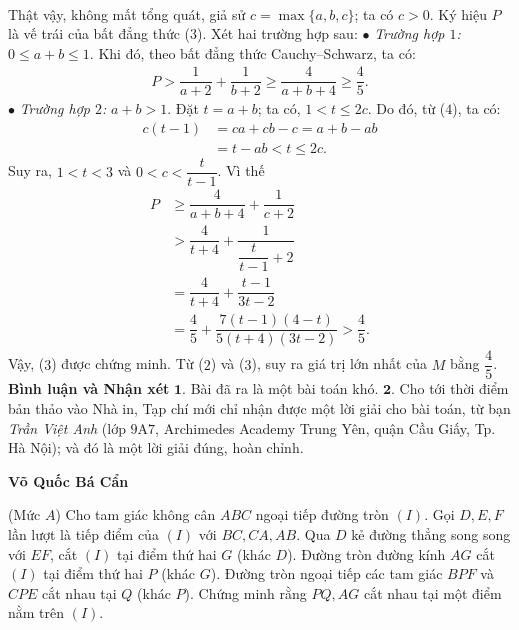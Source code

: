 \begin{multicols}{2}
\begin{align*}
	\end{align*}
	Thật vậy, không mất tổng quát, giả sử \linebreak$c = \max\{a,b,c\}$;  ta có $c > 0$.
	\vskip 0.05cm
	Ký hiệu $P$ là vế trái của bất đẳng thức ($3$).
	\vskip 0.05cm
	Xét hai trường hợp sau:
	\vskip 0.05cm
	$\bullet$ \textit{Trường hợp $1$:} $0 \le a + b \le 1$.
	\vskip 0.05cm
	Khi đó, theo bất đẳng thức Cauchy--Schwarz, ta có:
	\begin{align*}
		P > \dfrac{1}{{a + 2}} + \dfrac{1}{{b + 2}} \ge \dfrac{4}{{a + b + 4}} \ge \dfrac{4}{5}.
	\end{align*}
	$\bullet$ \textit{Trường hợp $2$:} $a + b > 1$.
	\vskip 0.05cm
	Đặt $t = a + b$; ta có, $1 < t \le 2c$. Do đó, từ ($4$), ta có:
	\begin{align*}
		c(t - 1) &= ca + cb - c = a + b - ab \\
		&= t - ab < t \le 2c.
	\end{align*}
	Suy ra, $1 < t < 3$ và $0 < c < \dfrac{t}{t-1}$.  
	Vì thế
	\begin{align*}
		P &\ge \dfrac{4}{a + b + 4} + \dfrac{1}{c + 2}\\
		 &> \dfrac{4}{t + 4} + \dfrac{1}{\dfrac{t}{t-1} + 2}\\
		 &= \dfrac{4}{t + 4} + \dfrac{t-1}{3t - 2}\\
		 &= \dfrac{4}{5} + \dfrac{7(t-1)(4-t)}{5(t+4)(3t-2)}>\dfrac{4}{5}.
	\end{align*}
	Vậy, ($3$) được chứng minh.
	\vskip 0.05cm
	Từ ($2$) và ($3$), suy ra giá trị lớn nhất của $M$ bằng $\dfrac{4}{5}$.
	\vskip 0.05cm 
	\textbf{\color{thachthuctoanhoc}Bình luận và Nhận xét}
	\vskip 0.05cm
	$\pmb{1.}$ Bài đã ra là một bài toán khó.
	\vskip 0.05cm
	$\pmb{2.}$ Cho tới thời điểm bản thảo vào Nhà in, Tạp chí mới chỉ nhận được một lời giải cho bài toán, từ bạn \textit{Trần Việt Anh} (lớp $9$A$7$, Archimedes Academy Trung Yên, quận Cầu Giấy, Tp. Hà Nội); và đó là một lời giải đúng, hoàn chỉnh.
	\begin{flushright}
		\textbf{\color{thachthuctoanhoc}Võ Quốc Bá Cẩn}
	\end{flushright}
	{}
	(Mức $A$) Cho tam giác không cân $ABC$ ngoại tiếp đường tròn $(I)$. Gọi $D,E,F$ lần lượt là tiếp điểm của $(I)$ với $BC,CA,AB$. Qua $D$ kẻ đường thẳng song song với $EF$, cắt $(I)$ tại điểm thứ hai $G$ (khác $D$). Đường tròn đường kính $AG$ cắt $(I)$ tại điểm thứ hai $P$ (khác $G$). Đường tròn ngoại tiếp các tam giác $BPF$ và $CPE$ cắt nhau tại $Q$ (khác $P$). Chứng minh rằng $PQ,AG$ cắt nhau tại một điểm nằm trên $(I)$. 

\end{multicols}
